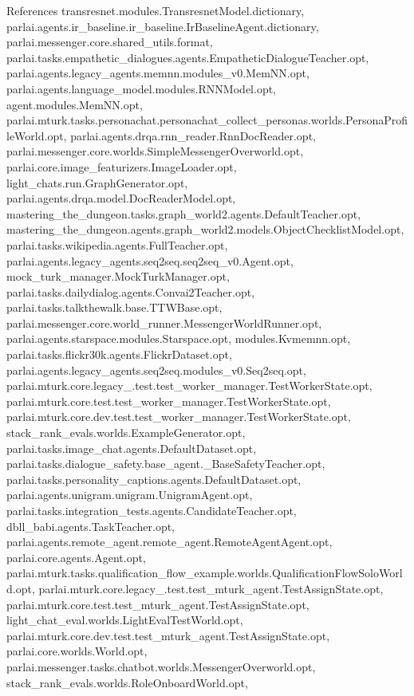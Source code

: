 References transresnet.\+modules.\+Transresnet\+Model.\+dictionary, parlai.\+agents.\+ir\+\_\+baseline.\+ir\+\_\+baseline.\+Ir\+Baseline\+Agent.\+dictionary, parlai.\+messenger.\+core.\+shared\+\_\+utils.\+format, parlai.\+tasks.\+empathetic\+\_\+dialogues.\+agents.\+Empathetic\+Dialogue\+Teacher.\+opt, parlai.\+agents.\+legacy\+\_\+agents.\+memnn.\+modules\+\_\+v0.\+Mem\+N\+N.\+opt, parlai.\+agents.\+language\+\_\+model.\+modules.\+R\+N\+N\+Model.\+opt, agent.\+modules.\+Mem\+N\+N.\+opt, parlai.\+mturk.\+tasks.\+personachat.\+personachat\+\_\+collect\+\_\+personas.\+worlds.\+Persona\+Profile\+World.\+opt, parlai.\+agents.\+drqa.\+rnn\+\_\+reader.\+Rnn\+Doc\+Reader.\+opt, parlai.\+messenger.\+core.\+worlds.\+Simple\+Messenger\+Overworld.\+opt, parlai.\+core.\+image\+\_\+featurizers.\+Image\+Loader.\+opt, light\+\_\+chats.\+run.\+Graph\+Generator.\+opt, parlai.\+agents.\+drqa.\+model.\+Doc\+Reader\+Model.\+opt, mastering\+\_\+the\+\_\+dungeon.\+tasks.\+graph\+\_\+world2.\+agents.\+Default\+Teacher.\+opt, mastering\+\_\+the\+\_\+dungeon.\+agents.\+graph\+\_\+world2.\+models.\+Object\+Checklist\+Model.\+opt, parlai.\+tasks.\+wikipedia.\+agents.\+Full\+Teacher.\+opt, parlai.\+agents.\+legacy\+\_\+agents.\+seq2seq.\+seq2seq\+\_\+v0.\+Agent.\+opt, mock\+\_\+turk\+\_\+manager.\+Mock\+Turk\+Manager.\+opt, parlai.\+tasks.\+dailydialog.\+agents.\+Convai2\+Teacher.\+opt, parlai.\+tasks.\+talkthewalk.\+base.\+T\+T\+W\+Base.\+opt, parlai.\+messenger.\+core.\+world\+\_\+runner.\+Messenger\+World\+Runner.\+opt, parlai.\+agents.\+starspace.\+modules.\+Starspace.\+opt, modules.\+Kvmemnn.\+opt, parlai.\+tasks.\+flickr30k.\+agents.\+Flickr\+Dataset.\+opt, parlai.\+agents.\+legacy\+\_\+agents.\+seq2seq.\+modules\+\_\+v0.\+Seq2seq.\+opt, parlai.\+mturk.\+core.\+legacy\+\_.\+test.\+test\+\_\+worker\+\_\+manager.\+Test\+Worker\+State.\+opt, parlai.\+mturk.\+core.\+test.\+test\+\_\+worker\+\_\+manager.\+Test\+Worker\+State.\+opt, parlai.\+mturk.\+core.\+dev.\+test.\+test\+\_\+worker\+\_\+manager.\+Test\+Worker\+State.\+opt, stack\+\_\+rank\+\_\+evals.\+worlds.\+Example\+Generator.\+opt, parlai.\+tasks.\+image\+\_\+chat.\+agents.\+Default\+Dataset.\+opt, parlai.\+tasks.\+dialogue\+\_\+safety.\+base\+\_\+agent.\+\_\+\+Base\+Safety\+Teacher.\+opt, parlai.\+tasks.\+personality\+\_\+captions.\+agents.\+Default\+Dataset.\+opt, parlai.\+agents.\+unigram.\+unigram.\+Unigram\+Agent.\+opt, parlai.\+tasks.\+integration\+\_\+tests.\+agents.\+Candidate\+Teacher.\+opt, dbll\+\_\+babi.\+agents.\+Task\+Teacher.\+opt, parlai.\+agents.\+remote\+\_\+agent.\+remote\+\_\+agent.\+Remote\+Agent\+Agent.\+opt, parlai.\+core.\+agents.\+Agent.\+opt, parlai.\+mturk.\+tasks.\+qualification\+\_\+flow\+\_\+example.\+worlds.\+Qualification\+Flow\+Solo\+World.\+opt, parlai.\+mturk.\+core.\+legacy\+\_.\+test.\+test\+\_\+mturk\+\_\+agent.\+Test\+Assign\+State.\+opt, parlai.\+mturk.\+core.\+test.\+test\+\_\+mturk\+\_\+agent.\+Test\+Assign\+State.\+opt, light\+\_\+chat\+\_\+eval.\+worlds.\+Light\+Eval\+Test\+World.\+opt, parlai.\+mturk.\+core.\+dev.\+test.\+test\+\_\+mturk\+\_\+agent.\+Test\+Assign\+State.\+opt, parlai.\+core.\+worlds.\+World.\+opt, parlai.\+messenger.\+tasks.\+chatbot.\+worlds.\+Messenger\+Overworld.\+opt, stack\+\_\+rank\+\_\+evals.\+worlds.\+Role\+Onboard\+World.\+opt, 